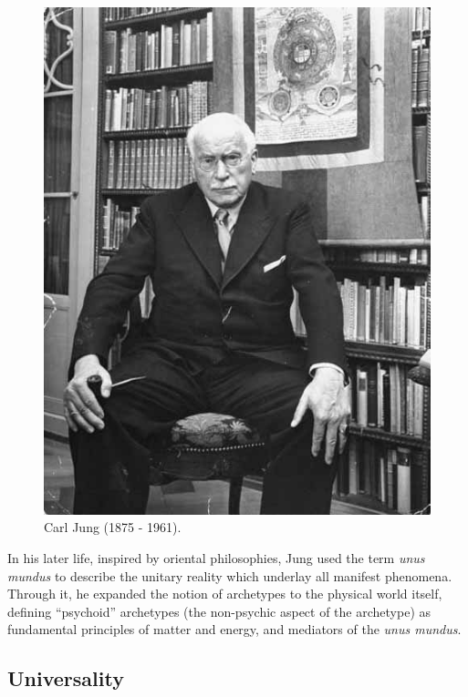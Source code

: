 \documentclass[
]{book}
\begin{document}
\begin{figure}

{\centering \includegraphics[width=\textwidth]{img/jung} 

}

\caption{Carl Jung (1875 - 1961).}\label{fig:unnamed-chunk-6}
\end{figure}

In his later life, inspired by oriental philosophies, Jung used the term \emph{unus mundus} to describe the unitary reality which underlay all manifest phenomena. Through it, he expanded the notion of archetypes to the physical world itself, defining ``psychoid'' archetypes (the non-psychic aspect of the archetype) as fundamental principles of matter and energy, and mediators of the \emph{unus mundus}.

\hypertarget{universality}{%
\subsection{Universality}\label{universality}}
\end{document}
